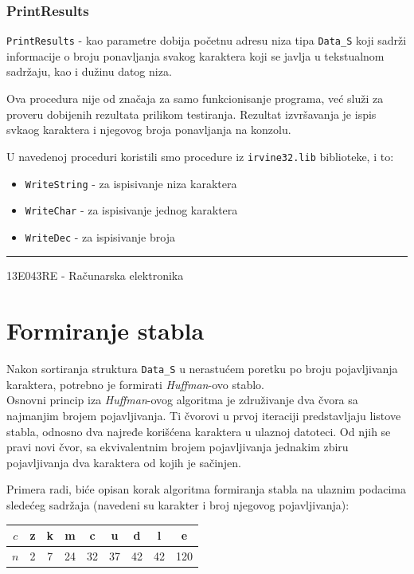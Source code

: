 \documentclass[a4paper, 12pt]{article}
\newcommand{\btmline}{
\vfill
\rule{0.9\textwidth}{0.4mm}
\begin{center}
13E043RE - Računarska elektronika
\end{center}}
\newcommand{\Huff}{\emph{Huffman}}
\begin{document}
\subsubsection*{\textsf{PrintResults}}

\verb|PrintResults| - kao parametre dobija početnu adresu niza tipa \verb|Data_S| koji sadrži informacije o broju ponavljanja svakog karaktera koji se javlja u tekstualnom sadržaju, kao i dužinu datog niza.
  
Ova procedura nije od značaja za samo funkcionisanje programa, već služi za proveru dobijenih rezultata prilikom testiranja. Rezultat izvršavanja je ispis svkaog karaktera i njegovog broja ponavljanja na konzolu.

U navedenoj proceduri koristili smo procedure iz \verb|irvine32.lib| biblioteke, i to: 
\begin{itemize}
\setlength\itemsep{0.1em}
\item \verb|WriteString| - za ispisivanje niza karaktera
\item \verb|WriteChar| - za ispisivanje jednog karaktera
\item \verb|WriteDec| - za ispisivanje broja
\end{itemize}

\btmline\newpage

\section*{Formiranje stabla}
Nakon sortiranja struktura \verb|Data_S| u nerastućem poretku po broju pojavljivanja karaktera, potrebno je formirati \emph{Huffman}-ovo stablo. \\
Osnovni princip iza \Huff-ovog algoritma je združivanje dva čvora sa najmanjim brojem pojavljivanja. Ti čvorovi u prvoj iteraciji predstavljaju listove stabla, odnosno dva najređe korišćena karaktera u ulaznoj datoteci. Od njih se pravi novi čvor, sa ekvivalentnim brojem pojavljivanja jednakim zbiru pojavljivanja dva karaktera od kojih je sačinjen.

Primera radi, biće opisan korak algoritma formiranja stabla na ulaznim podacima sledećeg sadržaja (navedeni su karakter i broj njegovog pojavljivanja):
\begin{table}[ht]
	\centering
	\begin{tabular}{| c ||  c  c  c  c  c  c  c  c |}
		\hline
		$c$ & z & k & m & c & u & d & l & e \\ \hline
		$n$ & 2 & 7 & 24 & 32 & 37 & 42 & 42 & 120 \\ \hline
	\end{tabular}
\end{table}
\end{document}
